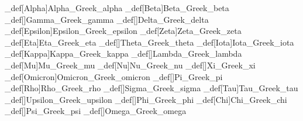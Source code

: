 \brl@char_def[Alpha]{Alpha}{\brl@char@alias_Greek\brl@char@alias_alpha}
\brl@char_def[Beta]{Beta}{\brl@char@alias_Greek\brl@char@alias_beta}
\brl@char_def[]{Gamma}{\brl@char@alias_Greek\brl@char@alias_gamma}
\brl@char_def[]{Delta}{\brl@char@alias_Greek\brl@char@alias_delta}
\brl@char_def[Epsilon]{Epsilon}{\brl@char@alias_Greek\brl@char@alias_epsilon}
\brl@char_def[Zeta]{Zeta}{\brl@char@alias_Greek\brl@char@alias_zeta}
\brl@char_def[Eta]{Eta}{\brl@char@alias_Greek\brl@char@alias_eta}
\brl@char_def[]{Theta}{\brl@char@alias_Greek\brl@char@alias_theta}
\brl@char_def[Iota]{Iota}{\brl@char@alias_Greek\brl@char@alias_iota}
\brl@char_def[Kappa]{Kappa}{\brl@char@alias_Greek\brl@char@alias_kappa}
\brl@char_def[]{Lambda}{\brl@char@alias_Greek\brl@char@alias_lambda}
\brl@char_def[Mu]{Mu}{\brl@char@alias_Greek\brl@char@alias_mu}
\brl@char_def[Nu]{Nu}{\brl@char@alias_Greek\brl@char@alias_nu}
\brl@char_def[]{Xi}{\brl@char@alias_Greek\brl@char@alias_xi}
\brl@char_def[Omicron]{Omicron}{\brl@char@alias_Greek\brl@char@alias_omicron}
\brl@char_def[]{Pi}{\brl@char@alias_Greek\brl@char@alias_pi}
\brl@char_def[Rho]{Rho}{\brl@char@alias_Greek\brl@char@alias_rho}
\brl@char_def[]{Sigma}{\brl@char@alias_Greek\brl@char@alias_sigma}
\brl@char_def[Tau]{Tau}{\brl@char@alias_Greek\brl@char@alias_tau}
\brl@char_def[]{Upsilon}{\brl@char@alias_Greek\brl@char@alias_upsilon}
\brl@char_def[]{Phi}{\brl@char@alias_Greek\brl@char@alias_phi}
\brl@char_def[Chi]{Chi}{\brl@char@alias_Greek\brl@char@alias_chi}
\brl@char_def[]{Psi}{\brl@char@alias_Greek\brl@char@alias_psi}
\brl@char_def[]{Omega}{\brl@char@alias_Greek\brl@char@alias_omega}


